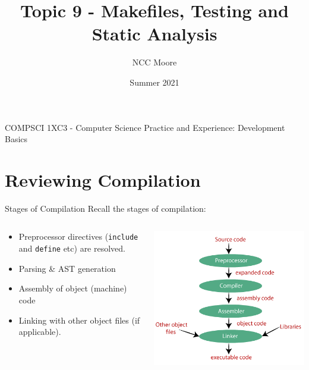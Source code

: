 \documentclass[11pt]{beamer}
\author{NCC Moore}
\title{Topic 9 - Makefiles, Testing and Static Analysis}
\institute{McMaster University}
\date{Summer 2021}
\begin{document}
\begin{frame}
\center
COMPSCI 1XC3 - Computer Science Practice and Experience:
Development Basics
\titlepage
\end{frame}

\begin{frame}
\tableofcontents
\end{frame}

\section[Compilation]{Reviewing Compilation}
\begin{frame}{Stages of Compilation}
Recall the stages of compilation: \\
\begin{columns}
\begin{column}{0.4\textwidth}
\begin{itemize}
\item Preprocessor directives (\texttt{include} and \texttt{define} etc) are resolved.
\item Parsing \& AST generation
\item Assembly of object (machine) code 
\item Linking with other object files (if applicable).
\end{itemize}
\end{column}
\begin{column}{0.6\textwidth}
\includegraphics[scale=0.40]{stages.png}
\end{column}
\end{columns}
\end{frame}
\end{document}
